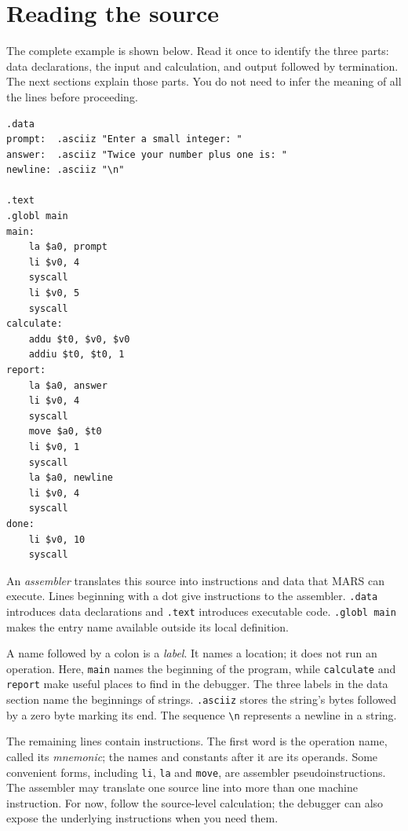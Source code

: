 \section{Reading the source}

The complete example is shown below. Read it once to identify the three parts:
data declarations, the input and calculation, and output followed by termination.
The next sections explain those parts. You do not need to infer the meaning of
all the lines before proceeding.

\begin{verbatim}
.data
prompt:  .asciiz "Enter a small integer: "
answer:  .asciiz "Twice your number plus one is: "
newline: .asciiz "\n"

.text
.globl main
main:
    la $a0, prompt
    li $v0, 4
    syscall
    li $v0, 5
    syscall
calculate:
    addu $t0, $v0, $v0
    addiu $t0, $t0, 1
report:
    la $a0, answer
    li $v0, 4
    syscall
    move $a0, $t0
    li $v0, 1
    syscall
    la $a0, newline
    li $v0, 4
    syscall
done:
    li $v0, 10
    syscall
\end{verbatim}

An \emph{assembler} translates this source into instructions and data that MARS
can execute. Lines beginning with a dot give instructions to the assembler.
\texttt{.data} introduces data declarations and \texttt{.text} introduces executable
code. \texttt{.globl main} makes the entry name available outside its local definition.

A name followed by a colon is a \emph{label}. It names a location; it does not run
an operation. Here, \texttt{main} names the beginning of the program, while
\texttt{calculate} and \texttt{report} make useful places to find in the debugger.
The three labels in the data section name the beginnings of strings.
\texttt{.asciiz} stores the string's bytes followed by a zero byte marking its end.
The sequence \texttt{\textbackslash n} represents a newline in a string.

The remaining lines contain instructions. The first word is the operation name,
called its \emph{mnemonic}; the names and constants after it are its operands.
Some convenient forms, including \texttt{li}, \texttt{la} and \texttt{move}, are
assembler pseudoinstructions. The assembler may translate one source line into
more than one machine instruction. For now, follow the source-level calculation;
the debugger can also expose the underlying instructions when you need them.

